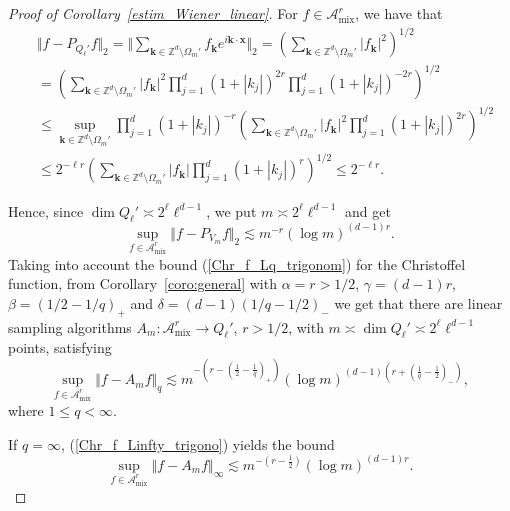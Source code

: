 \documentclass[a4paper,12pt]{amsart}
\theoremstyle{definition}
\theoremstyle{remark}
\newcommand{\abs}[1]{\left|#1\right|}
\newcommand{\bk}{\mathbf{k}}
\newcommand{\bx}{\mathbf{x}}
\newcommand{\mix}{\ensuremath{\mathrm{mix}}}
\begin{document}
{\begin{proof}[Proof of Corollary~\ref{estim_Wiener_linear}]
For $f \in \mathcal{A}^r_{\mix}$, we have that 
\begin{align*}
&\Vert f  - P_{Q_\ell'} f  \Vert_2  
=	\Vert  \sum_{\bk\in \mathbb{Z}^d \setminus \Omega_m'} f_{\bk} e^{i \bk \cdot \bx }  \Vert_2
= 	\left( \sum_{\bk\in \mathbb{Z}^d \setminus \Omega_m'} \abs{f_{\bk}}^2 \right)^{1/2}
	\\
&	=  \left( \sum_{\bk\in \mathbb{Z}^d \setminus \Omega_m'} \abs{f_{\bk}}^2  \prod_{j=1}^{d} (1+ \abs{k_j})^{2r} \prod_{j=1}^{d} (1+ \abs{k_j})^{-2r} \right)^{1/2}
	\\
&	\leq \sup_{\bk \in \mathbb{Z}^d \setminus \Omega_m'} \prod_{j=1}^{d} (1+ \abs{k_j})^{-r}
	\left( \sum_{\bk\in \mathbb{Z}^d \setminus \Omega_m'} \abs{f_{\bk}}^2  \prod_{j=1}^{d} (1+ \abs{k_j})^{2r} \right)^{1/2}
	\\
&	\leq  2^{-\ell r} \left( \sum_{\bk\in \mathbb{Z}^d \setminus \Omega_m'} \abs{f_{\bk}}  \prod_{j=1}^{d} (1+ \abs{k_j})^{r} \right)^{1/2} 
 \leq 2^{-\ell r} .
\end{align*}



Hence, since  $\dim{Q_\ell'} \asymp 2^\ell \ell^{d-1}$, we put $m \asymp 2^\ell \ell^{d-1} $ and get 
$$
\sup_{f \in \mathcal{A}^r_{\mix}} \Vert f - P_{V_m} f  \Vert_2\lesssim  m^{-r} (\log m)^{(d-1)r}.
$$
Taking into account the bound  (\ref{Chr_f_Lq_trigonom}) for the Christoffel function, 
from 
{Corollary~\ref{coro:general}}
with
$\alpha = r >1/2$, $\gamma =(d-1)r$, 
$\beta = (1/2-1/q)_+$ and $\delta =(d-1)(1/q-1/2)_-$
we get that
there are linear sampling algorithms $A_m \colon \mathcal{A}^r_{\mix}\to Q_\ell'$,
 $r>1/2$, with $m \asymp \dim Q_\ell' \asymp 2^\ell \ell^{d-1}$
  {points,}
satisfying
$$
\sup_{f \in \mathcal{A}^r_{\mix}} \Vert f - A_m f  \Vert_q \lesssim 
m^{-(r - (\frac12-\frac{1}{q})_+)} 
(\log m)^{(d-1)(r+ (\frac{1}{q}-\frac{1}{2})_-)},
$$
where 
$1\leq q <\infty$.

If $q=\infty$, (\ref{Chr_f_Linfty_trigono}) yields the bound
$$
\sup_{f \in \mathcal{A}^r_{\mix}} \Vert f - A_m f  \Vert_\infty \lesssim 
m^{-(r - \frac12)} 
(\log m)^{(d-1)r}.
$$%
\end{proof}


}
\end{document}
